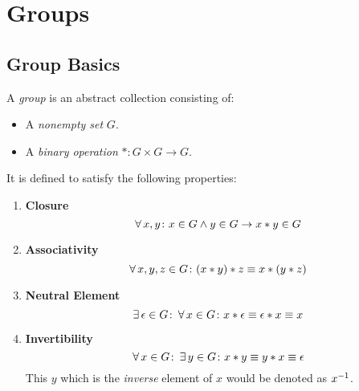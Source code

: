 \chapter{Groups}

\section{Group Basics}

A \textit{group} is an abstract collection consisting of:
\begin{itemize}
    \item A \textit{nonempty set} $G$.
    \item A \textit{binary operation} $\ast \colon G \times G \to G$.
\end{itemize}

It is defined to satisfy the following properties:
\begin{enumerate}
    \item \textbf{Closure}
    \begin{equation}
        \operatorname{\forall} x, y \colon x \in G \land y \in G \to x \ast y \in G
    \end{equation}
    \item \textbf{Associativity}
    \begin{equation}
        \operatorname{\forall} x, y, z \in G \colon (x \ast y) \ast z \equiv x \ast (y \ast z)
    \end{equation}
    \item \textbf{Neutral Element}
    \begin{equation}
        \operatorname{\exists} \epsilon \in G \colon \operatorname{\forall} x \in G \colon x \ast \epsilon \equiv \epsilon \ast x \equiv x
    \end{equation}
    \item \textbf{Invertibility}
    \begin{equation}
        \operatorname{\forall} x \in G \colon \operatorname{\exists} y \in G \colon x \ast y \equiv y \ast x \equiv \epsilon
    \end{equation}
    This $y$ which is the \textit{inverse} element of $x$ would be denoted as ${x}^{-1}$.
\end{enumerate}
